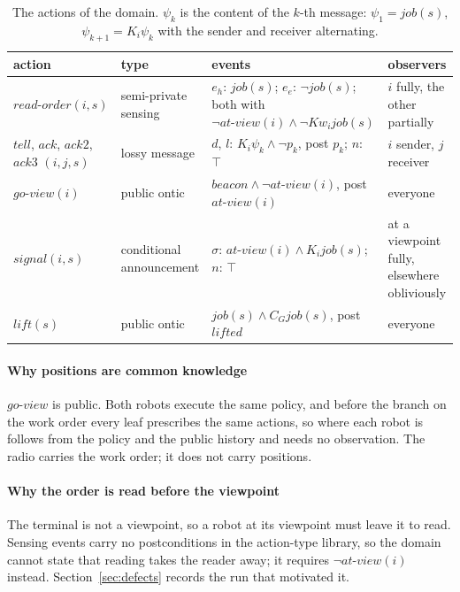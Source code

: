 \documentclass[11pt,a4paper]{article}
\theoremstyle{definition}
\newcommand{\Kop}[1]{K_{#1}}
\newcommand{\Cop}[1]{C_{#1}}
\newcommand{\Kw}[1]{\mathit{Kw}_{#1}}
\newcommand{\job}{\mathit{job}}
\newcommand{\atview}{\mathit{at\text{-}view}}
\begin{document}
\begin{table}[H]
\centering\small
\caption{The actions of the domain. $\psi_k$ is the content of the $k$-th
message: $\psi_1 = \job(s)$, $\psi_{k+1} = \Kop{i}\psi_k$ with the sender and
receiver alternating.}
\label{tab:actions}
\begin{tabularx}{\textwidth}{@{}>{\raggedright\arraybackslash}p{3.3cm} >{\raggedright\arraybackslash}p{2.5cm} >{\raggedright\arraybackslash}X >{\raggedright\arraybackslash}p{2.9cm}@{}}
\toprule
action & type & events & observers \\
\midrule
$\mathit{read\text{-}order}(i, s)$ & semi-private sensing & $e_h$: $\job(s)$; $e_e$: $\neg\job(s)$; both with $\neg\atview(i) \wedge \neg\Kw{i}\job(s)$ & $i$ fully, the other partially \\
$\mathit{tell}$, $\mathit{ack}$, $\mathit{ack2}$, $\mathit{ack3}$ $(i,j,s)$ & lossy message & $d$, $l$: $\Kop{i}\psi_k \wedge \neg p_k$, post $p_k$; $n$: $\top$ & $i$ sender, $j$ receiver \\
$\mathit{go\text{-}view}(i)$ & public ontic & $\mathit{beacon} \wedge \neg\atview(i)$, post $\atview(i)$ & everyone \\
$\mathit{signal}(i, s)$ & conditional announcement & $\sigma$: $\atview(i) \wedge \Kop{i}\job(s)$; $n$: $\top$ & at a viewpoint fully, elsewhere obliviously \\
$\mathit{lift}(s)$ & public ontic & $\job(s) \wedge \Cop{G}\job(s)$, post $\mathit{lifted}$ & everyone \\
\bottomrule
\end{tabularx}
\end{table}

\paragraph{Why positions are common knowledge} $\mathit{go\text{-}view}$ is
public. Both robots execute the same policy, and before the branch on the work
order every leaf prescribes the same actions, so where each robot is follows
from the policy and the public history and needs no observation. The radio
carries the work order; it does not carry positions.

\paragraph{Why the order is read before the viewpoint} The terminal is not a
viewpoint, so a robot at its viewpoint must leave it to read. Sensing events
carry no postconditions in the action-type library, so the domain cannot state
that reading takes the reader away; it requires $\neg\atview(i)$ instead.
Section~\ref{sec:defects} records the run that motivated it.
\end{document}
